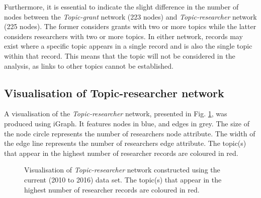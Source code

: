 Furthermore, it is essential to indicate the slight difference in the number of nodes between the \textit{Topic-grant} network (223 nodes) and \textit{Topic-researcher} network (225 nodes). The former considers grants with two or more topics while the latter considers researchers with two or more topics. In either network, records may exist where a specific topic appears in a single record and is also the single topic within that record. This means that the topic will not be considered in the analysis, as links to other topics cannot be established.

\subsection{Visualisation of Topic-researcher network}

A visualisation of the \textit{Topic-researcher} network, presented in Fig. \ref{figure:topic_b_current_vis}, was produced using iGraph. It features nodes in blue, and edges in grey. The size of the node circle represents the number of researchers node attribute. The width of the edge line represents the number of researchers edge attribute. The topic(s) that appear in the highest number of researcher records are coloured in red.

\begin{figure}[htpb]
    \centering
    \caption[Visualisation of \textit{Topic-researcher} network constructed using the current (2010 to 2016) data set]{Visualisation of \textit{Topic-researcher} network constructed using the current (2010 to 2016) data set. The topic(s) that appear in the highest number of researcher records are coloured in red.}
    \label{figure:topic_b_current_vis}
\end{figure}
